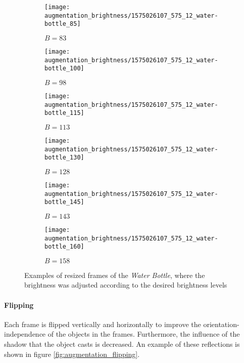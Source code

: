 \begin{figure}
  \centering
  \begin{subfigure}[b]{0.15\textwidth}
    \centering
    \texttt{[image: augmentation\_brightness/1575026107\_575\_12\_water-bottle\_85]}
    \caption{$B = 83$}
    \label{subfig:ab_85}
  \end{subfigure}
  \begin{subfigure}[b]{0.15\textwidth}
    \centering
    \texttt{[image: augmentation\_brightness/1575026107\_575\_12\_water-bottle\_100]}
    \caption{$B = 98$}
    \label{subfig:ab_100}
  \end{subfigure}
  \begin{subfigure}[b]{0.15\textwidth}
    \centering
    \texttt{[image: augmentation\_brightness/1575026107\_575\_12\_water-bottle\_115]}
    \caption{$B = 113$}
    \label{subfig:ab_115}
  \end{subfigure}
  \begin{subfigure}[b]{0.15\textwidth}
    \centering
    \texttt{[image: augmentation\_brightness/1575026107\_575\_12\_water-bottle\_130]}
    \caption{$B = 128$}
    \label{subfig:ab_130}
  \end{subfigure}
  \begin{subfigure}[b]{0.15\textwidth}
    \centering
    \texttt{[image: augmentation\_brightness/1575026107\_575\_12\_water-bottle\_145]}
    \caption{$B = 143$}
    \label{subfig:ab_145}
  \end{subfigure}
  \begin{subfigure}[b]{0.15\textwidth}
    \centering
    \texttt{[image: augmentation\_brightness/1575026107\_575\_12\_water-bottle\_160]}
    \caption{$B = 158$}
    \label{subfig:ab_160}
  \end{subfigure}
  \caption{Examples of resized frames of the \textit{Water Bottle}, where the brightness was adjusted according to the desired brightness levels}
  \label{fig:augmentation_brightness}
\end{figure}

\paragraph{Flipping}
Each frame is flipped vertically and horizontally to improve the orientation-independence of the objects in the frames.
Furthermore, the influence of the shadow that the object casts is decreased.
An example of these reflections is shown in figure \ref{fig:augmentation_flipping}.

